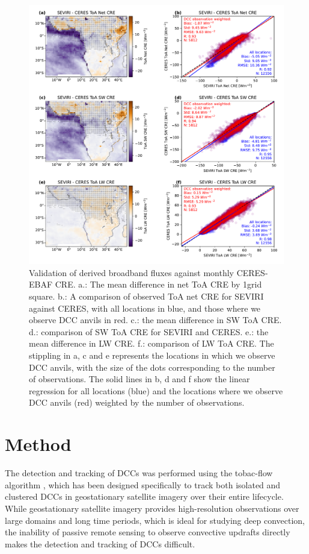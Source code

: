 \documentclass[acp, manuscript]{copernicus}
\begin{document}
\begin{figure}[tp]
    \includegraphics[width=12cm]{figures/fig03.pdf}
    \caption[
    Validation of derived broadband fluxes against monthly CERES-EBAF CRE
    ]{
    Validation of derived broadband fluxes against monthly CERES-EBAF CRE. a.: The mean difference in net ToA CRE by 1\textdegree grid square. b.: A comparison of observed ToA net CRE for SEVIRI against CERES, with all locations in blue, and those where we observe DCC anvils in red. c.: the mean difference in SW ToA CRE. d.: comparison of SW ToA CRE for SEVIRI and CERES. e.: the mean difference in LW CRE. f.: comparison of LW ToA CRE. The stippling in a, c and e represents the locations in which we observe DCC anvils, with the size of the dots corresponding to the number of observations. The solid lines in b, d and f show the linear regression for all locations (blue) and the locations where we observe DCC anvils (red) weighted by the number of observations.
    }
    \label{fig:flux_validation}
\end{figure}

\section{Method}

The detection and tracking of DCCs was performed using the tobac-flow algorithm \citep{jones_semilagrangian_2023}, which has been designed specifically to track both isolated and clustered DCCs in geostationary satellite imagery over their entire lifecycle. 
While geostationary satellite imagery provides high-resolution observations over large domains and long time periods, which is ideal for studying deep convection, the inability of passive remote sensing to observe convective updrafts directly makes the detection and tracking of DCCs difficult.
\end{document}

